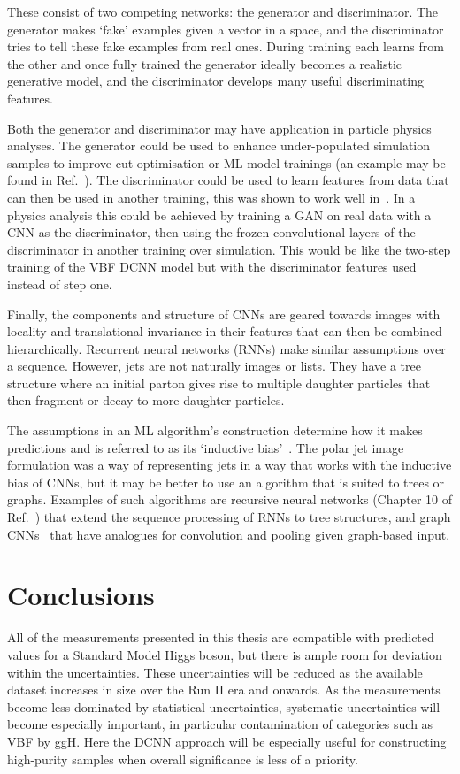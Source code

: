 These consist of two competing networks: the generator and discriminator. 
The generator makes `fake' examples given a vector in a space, and the discriminator tries to tell these fake examples from real ones. 
During training each learns from the other and once fully trained the generator ideally becomes a realistic generative model, and the discriminator develops many useful discriminating features.

Both the generator and discriminator may have application in particle physics analyses. The generator could be used to enhance under-populated simulation samples to improve cut optimisation or ML model trainings (an example may be found in Ref.~\cite{GANChest}).
The discriminator could be used to learn features from data that can then be used in another training, this was shown to work well in~\cite{DCGAN}. 
In a physics analysis this could be achieved by training a GAN on real data with a CNN as the discriminator, then using the frozen convolutional layers of the discriminator in another training over simulation. 
This would be like the two-step training of the VBF DCNN model but with the discriminator features used instead of step one.


Finally, the components and structure of CNNs are geared towards images with locality and translational invariance in their features that can then be combined hierarchically. 
Recurrent neural networks (RNNs) make similar assumptions over a sequence. 
However, jets are not naturally images or lists. They have a tree structure where an initial parton gives rise to multiple daughter particles that then fragment or decay to more daughter particles.

The assumptions in an ML algorithm's construction determine how it makes predictions and is referred to as its `inductive bias'~\cite{InductiveBias}.
The polar jet image formulation was a way of representing jets in a way that works with the inductive bias of CNNs, but it may be better to use an algorithm that is suited to trees or graphs.
Examples of such algorithms are recursive neural networks (Chapter 10 of Ref.~\cite{DeepLearningBook}) that extend the sequence processing of RNNs to tree structures, and graph CNNs~\cite{GraphCNNs} that have analogues for convolution and pooling given graph-based input.


\section{Conclusions}
All of the measurements presented in this thesis are compatible with predicted values for a Standard Model Higgs boson, but there is ample room for deviation within the uncertainties.
These uncertainties will be reduced as the available dataset increases in size over the Run II era and onwards. 
As the measurements become less dominated by statistical uncertainties, systematic uncertainties will become especially important, in particular contamination of categories such as VBF by ggH. 
Here the DCNN approach will be especially useful for constructing high-purity samples when overall significance is less of a priority.

